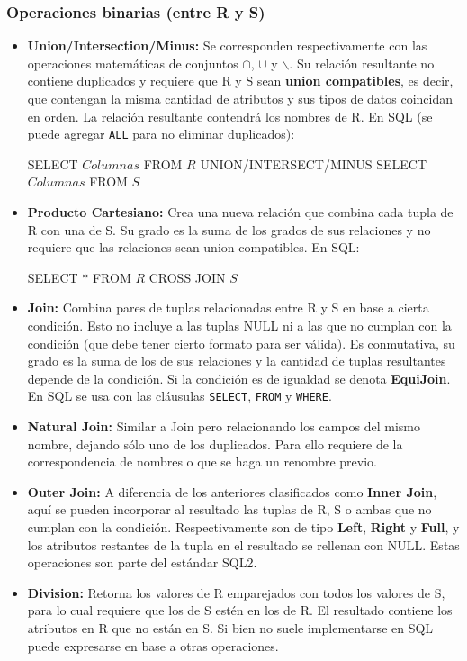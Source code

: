 \subsubsection*{Operaciones binarias (entre R y S)}
\begin{itemize}
    \item \textbf{Union/Intersection/Minus:} Se corresponden respectivamente con las operaciones matemáticas de conjuntos $\cap$, $\cup$ y $\backslash$. Su relación resultante no contiene duplicados y requiere que R y S sean \textbf{union compatibles}, es decir, que contengan la misma cantidad de atributos y sus tipos de datos coincidan en orden. La relación resultante contendrá los nombres de R. En SQL (se puede agregar \texttt{ALL} para no eliminar duplicados):
    \begin{SQL}
        SELECT $Columnas$ FROM $R$ UNION/INTERSECT/MINUS SELECT $Columnas$ FROM $S$
    \end{SQL}
    \item \textbf{Producto Cartesiano:} Crea una nueva relación que combina cada tupla de R con una de S. Su grado es la suma de los grados de sus relaciones y no requiere que las relaciones sean union compatibles. En SQL:
    \begin{SQL}
        SELECT $*$ FROM $R$ CROSS JOIN $S$
    \end{SQL}
    \item \textbf{Join:} Combina pares de tuplas relacionadas entre R y S en base a cierta condición. Esto no incluye a las tuplas NULL ni a las que no cumplan con la condición (que debe tener cierto formato para ser válida). Es conmutativa, su grado es la suma de los de sus relaciones y la cantidad de tuplas resultantes depende de la condición. Si la condición es de igualdad se denota \textbf{EquiJoin}. En SQL se usa con las cláusulas \texttt{SELECT}, \texttt{FROM} y \texttt{WHERE}.
    \item \textbf{Natural Join:} Similar a Join pero relacionando los campos del mismo nombre, dejando sólo uno de los duplicados. Para ello requiere de la correspondencia de nombres o que se haga un renombre previo.
    \item \textbf{Outer Join:} A diferencia de los anteriores clasificados como \textbf{Inner Join}, aquí se pueden incorporar al resultado las tuplas de R, S o ambas que no cumplan con la condición. Respectivamente son de tipo \textbf{Left}, \textbf{Right} y \textbf{Full}, y los atributos restantes de la tupla en el resultado se rellenan con NULL. Estas operaciones son parte del estándar SQL2.
    \item \textbf{Division:} Retorna los valores de R emparejados con todos los valores de S, para lo cual requiere que los de S estén en los de R. El resultado contiene los atributos en R que no están en S. Si bien no suele implementarse en SQL puede expresarse en base a otras operaciones.
\end{itemize}

